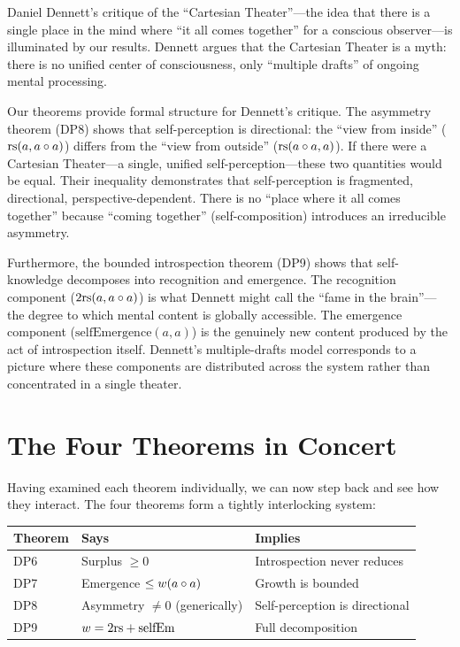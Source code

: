Daniel Dennett's critique of the ``Cartesian Theater''---the idea that
there is a single place in the mind where ``it all comes together''
for a conscious observer---is illuminated by our results. Dennett argues
that the Cartesian Theater is a myth: there is no unified center of
consciousness, only ``multiple drafts'' of ongoing mental processing.

Our theorems provide formal structure for Dennett's critique. The
asymmetry theorem (DP8) shows that self-perception is directional:
the ``view from inside'' ($\mathrm{rs}(a, a \circ a)$) differs from the
``view from outside'' ($\mathrm{rs}(a \circ a, a)$). If there were a
Cartesian Theater---a single, unified self-perception---these two
quantities would be equal. Their inequality demonstrates that
self-perception is fragmented, directional, perspective-dependent.
There is no ``place where it all comes together'' because
``coming together'' (self-composition) introduces an irreducible
asymmetry.

Furthermore, the bounded introspection theorem (DP9) shows that
self-knowledge decomposes into recognition and emergence. The
recognition component ($2 \mathrm{rs}(a, a \circ a)$) is what
Dennett might call the ``fame in the brain''---the degree to which
mental content is globally accessible. The emergence component
($\mathrm{selfEmergence}(a,a)$) is the genuinely new content produced
by the act of introspection itself. Dennett's multiple-drafts model
corresponds to a picture where these components are distributed
across the system rather than concentrated in a single theater.

\section{The Four Theorems in Concert}

Having examined each theorem individually, we can now step back and
see how they interact. The four theorems form a tightly interlocking
system:

\begin{center}
\begin{tabular}{lll}
\textbf{Theorem} & \textbf{Says} & \textbf{Implies} \\
\hline
DP6 & Surplus $\geq 0$ & Introspection never reduces \\
DP7 & Emergence $\leq w(a \circ a)$ & Growth is bounded \\
DP8 & Asymmetry $\neq 0$ (generically) & Self-perception is directional \\
DP9 & $w = 2\mathrm{rs} + \mathrm{selfEm}$ & Full decomposition \\
\end{tabular}
\end{center}


